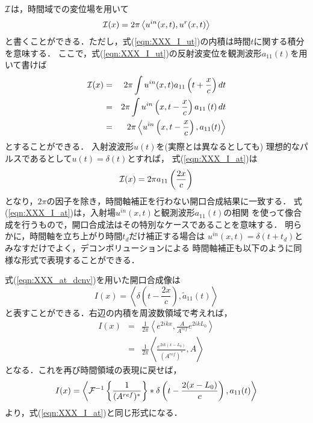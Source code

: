${\cal I}$は，時間域での変位場を用いて
\begin{equation}
	{\cal I}(x)= 2\pi \left< u^{in}(x,t), u^{r}(x,t)\right>
	\label{eqn:XXX_I_ut}
\end{equation}
と書くことができる．ただし，式(\ref{eqn:XXX_I_ut})の内積は時間$t$に関する積分を意味する．
ここで，式(\ref{eqn:XXX_I_ut})の反射波変位を観測波形$a_{11}(t)$を用いて書けば
\begin{eqnarray}
	{\cal I}(x) &= & 
	2\pi \int u^{in}(x,t) a_{11}\left(t+\frac{x}{c}\right) dt
	\\
	&=&
	2\pi \int u^{in}\left(x,t-\frac{x}{c}\right) a_{11}\left(t\right) dt \\
	&=&
	2\pi \left< u^{in}\left(x,t-\frac{x}{c}\right), a_{11}(t) \right>
	\label{eqn:XXX_I_at}
\end{eqnarray}
とすることができる．
入射波波形$u(t)$を(実際とは異なるとしても)
理想的なパルスであるとして$u(t)=\delta(t)$とすれば，
式(\ref{eqn:XXX_I_at})は
\begin{equation}
	{\cal I}(x)=2\pi a_{11}\left(\frac{2x}{c}\right)
	\label{eqn:XXX_24}
\end{equation}
となり，$2\pi$の因子を除き，時間軸補正を行わない開口合成結果に一致する．
式(\ref{eqn:XXX_I_at})は，入射場$u^{in}(x,t)$と観測波形$a_{11}(t)$の相関
を使って像合成を行うもので，開口合成法はその特別なケースであることを意味する．
明らかに，時間軸を立ち上がり時間$t_d$だけ補正する場合は
$u^{in}(x,t)=\delta(t+t_d)$とみなすだけでよく，デコンボリューションによる
時間軸補正も以下のように同様な形式で表現することができる．

式(\ref{eqn:XXX_at_dcnv})を用いた開口合成像は
\begin{equation}
	I(x)=\left< \delta\left(t-\frac{2x}{c}\right), \tilde a_{11}(t) \right>
	\label{eqn:XXX_25}
\end{equation}
と表すことができる．右辺の内積を周波数領域で考えれば，
\begin{eqnarray}
	I(x) &=&
	\frac{1}{2\pi}\left< e^{2ikx}, \frac{A}{A^{ref}}e^{2ikL_0} \right> \\
	&=&
	\frac{1}{2\pi}\left< \frac{e^{2ik(x-L_0)}}{(A^{ref})^*}, A \right> 
	\label{eqn:XXX_26}
\end{eqnarray}
となる．これを再び時間領域の表現に戻せば，
\begin{equation}
	I(x)= \left< {\cal F}^{-1}\left\{ \frac{1}{(A^{ref})^*}\right\} *\delta \left( t-\frac{2(x-L_0)}{c}\right), a_{11}(t) \right>
	\label{eqn:XXX_Ix_dcnv}
\end{equation}
より，式(\ref{eqn:XXX_I_at})と同じ形式になる．
